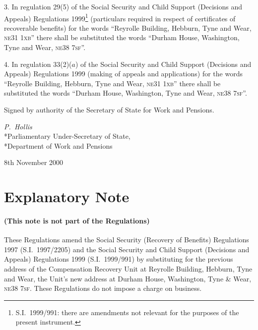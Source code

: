 \documentclass[12pt,a4paper]{article}
\begin{document}
3.  In regulation 29(5) of the Social Security and Child Support (Decisions and Appeals) Regulations 1999\footnote{S.I.\ 1999/991: there are amendments not relevant for the purposes of the present instrument.} (particulars required in respect of certificates of recoverable benefits) for the words “Reyrolle Building, Hebburn, Tyne and Wear, \textsc{\lowercase{NE31 1XB}}” there shall be substituted the words “Durham House, Washington, Tyne and Wear, \textsc{\lowercase{NE38 7SF}}”.

\medskip

4.  In regulation 33(2)($a$)  of the Social Security and Child Support (Decisions and Appeals) Regulations 1999 (making of appeals and applications) for the words “Reyrolle Building, Hebburn, Tyne and Wear, \textsc{\lowercase{NE31 1XB}}” there shall be substituted the words “Durham House, Washington, Tyne and Wear, \textsc{\lowercase{NE38 7SF}}”. 

\bigskip

Signed 
by authority of the Secretary of State for Work and Pensions.

{\raggedleft
\emph{P.~Hollis}\\*Parliamentary Under-Secretary of State,\\*Department of Work and Pensions

}

8th November 2000

\small

\part{Explanatory Note}

\renewcommand\parthead{— Explanatory Note}

\subsection*{(This note is not part of the Regulations)}

These Regulations amend the Social Security (Recovery of Benefits) Regulations 1997 (S.I.\ 1997/2205) and the Social Security and Child Support (Decisions and Appeals) Regulations 1999 (S.I.\ 1999/991) by substituting for the previous address of the Compensation Recovery Unit at Reyrolle Building, Hebburn, Tyne and Wear, the Unit’s new address at Durham House, Washington, Tyne \& Wear, \textsc{\lowercase{NE38 7SF}}. These Regulations do not impose a charge on business. 
\end{document}
